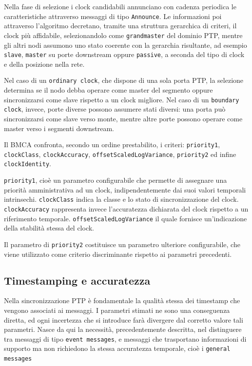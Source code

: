 Nella fase di selezione i clock candidabili annunciano con cadenza periodica le 
caratteristiche attraverso messaggi di tipo \texttt{Announce}. 
Le informazioni poi attraverso l'algoritmo decretano, tramite una struttura
gerarchica di criteri, il clock più affidabile, selezionandolo come \texttt{grandmaster} del dominio
PTP, mentre gli altri nodi assumono uno stato coerente con la gerarchia
risultante, ad esempio \texttt{slave}, \texttt{master} su porte downstream
oppure \texttt{passive}, a seconda del tipo di clock e della posizione nella
rete.

Nel caso di un \texttt{ordinary clock}, che dispone di una sola porta PTP, la selezione
determina se il nodo debba operare come master del segmento oppure sincronizzarsi
come slave rispetto a un clock migliore. Nel caso di un \texttt{boundary clock},
invece, porte diverse possono assumere stati diversi: una porta può
sincronizzarsi come slave verso monte, mentre altre porte possono operare come master
verso i segmenti downstream.

Il BMCA confronta, secondo un ordine prestabilito, i criteri: \texttt{priority1}, \texttt{clockClass},
\texttt{clockAccuracy}, \texttt{offsetScaledLogVariance}, \texttt{priority2} ed infine \texttt{clockIdentity}.

\texttt{priority1}, cioè 
un parametro configurabile che permette di assegnare una priorità amministrativa ad un clock, 
indipendentemente dai suoi valori temporali intrinsechi. \texttt{clockClass} indica la classe e 
lo stato di sincronizzazione del clock. \texttt{clockAccuracy} rappresenta invece l'accuratezza
dichiarata del clock rispetto a un riferimento temporale. \texttt{offsetScaledLogVariance} il quale fornisce un'indicazione della stabilità stessa
del clock.

Il parametro di \texttt{priority2} costituisce un parametro ulteriore configurabile, 
che viene utilizzato come criterio discriminante rispetto ai parametri precedenti.\cite{PTP_net}


\subsection{Timestamping e accuratezza}

Nella sincronizzazione PTP è fondamentale la qualità stessa dei timestamp che 
vengono associati ai messaggi. I parametri stimati ne sono una conseguenza diretta, ed
ogni incertezza che si introduce farà divergere dal corretto valore tali parametri.
Nasce da qui la necessità, precedentemente descritta, nel distinguere tra messaggi di tipo
 \texttt{event messages}, e messaggi che trasportano informazioni di
supporto ma non richiedono la stessa accuratezza temporale, cioè i \texttt{general
messages} \cite{IEEEStandardPrecision2020}

